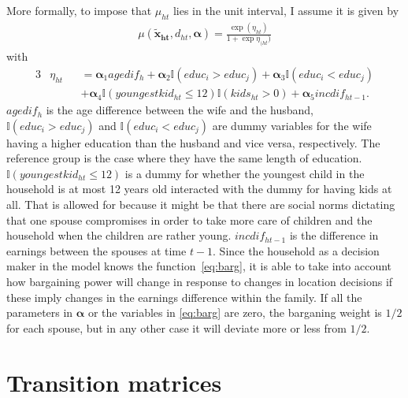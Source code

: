 More formally, to impose that $\mu_{ht}$ lies in the unit interval, I assume it is given by 
\begin{align}
\mu(\boldsymbol{\tilde{x}_{ht}},d_{ht},\boldsymbol{\alpha})= \frac{\exp{(\eta_{ht})}}{1+\exp{\eta_{(ht})}}
\label{eq:barg}
\end{align}
with
\begin{alignat*}{3}
&\eta_{ht}&&=\boldsymbol{\alpha}_1 agedif_h + \boldsymbol{\alpha}_2\mathbb{I}{(educ_i > educ_j)}+\boldsymbol{\alpha}_3\mathbb{I}{(educ_i < educ_j)} \\
& &&+ \boldsymbol{\alpha}_4 \mathbb{I}{(youngestkid_{ht}\leq 12)}\mathbb{I}{(kids_{ht}>0)} + \boldsymbol{\alpha}_5 incdif_{ht-1}.
\end{alignat*}
$agedif_h$ is the age difference between the wife and the husband, $\mathbb{I}{(educ_i > educ_j)}$ and $ \mathbb{I}{(educ_i < educ_j)}$
are dummy variables for the wife having a higher education than the husband and vice versa, respectively. The reference group is the case where they have the same length of education. $\mathbb{I}{(youngestkid_{ht} \leq 12)}$ is a dummy for whether the youngest child in the household is at most 12 years old interacted with the dummy for having kids at all. That is allowed for because it might be that there are social norms dictating that one spouse compromises in order to take more care of children and the household when the children are rather young. $incdif_{ht-1}$ is the difference in earnings between the spouses at time $t-1$. Since the household as a decision maker in the model knows the function~\ref{eq:barg}, it is able to take into account how bargaining power will change in response to changes in location decisions if these imply changes in the earnings difference within the family. 
If all the parameters in $\boldsymbol{\alpha}$ or the variables in \eqref{eq:barg} are zero, the barganing weight is $1/2$ for each spouse, but in any other case it will deviate more or less from $1/2$.

\section{Transition matrices}
